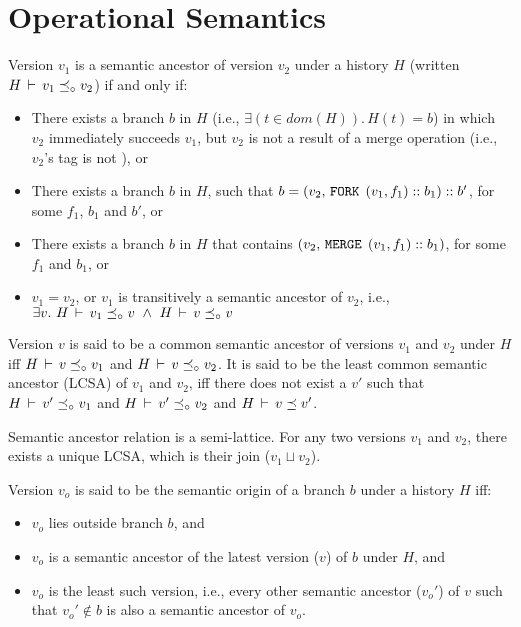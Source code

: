 \section{Operational Semantics}



\begin{definition} 
Version $v_1$ is a semantic ancestor of version $v_2$ under a history
$H$ (written $H\,\vdash\,v_1 \preceq_{\circ} v_2$) if and only if:
\begin{itemize}
  \item There exists a branch $b$ in $H$ (i.e., $\exists(t\in
  dom(H)).\,H(t) = b$) in which $v_2$ immediately succeeds
  $v_1$, but $v_2$ is not a result of a merge operation (i.e.,
  $v_2$'s tag is not ), or
  \item There exists a branch $b$ in $H$, such that $b = (v_2, 
  \,{\tt FORK}\,\; (v_1,f_1)::b_1)::b'$, for some $f_1$, $b_1$ and $b'$, or
  \item There exists a branch $b$ in $H$ that contains
  $(v_2, \,{\tt MERGE}\,\;(v_1,f_1)::b_1)$, for some $f_1$ and $b_1$, or
  \item $v_1 = v_2$, or $v_1$ is transitively a semantic ancestor of
  $v_2$, i.e., $\exists v.~ H\,\vdash\,v_1 \preceq_{\circ} v ~\wedge~
  H\,\vdash\,v \preceq_{\circ} v$ 
\end{itemize}
\end{definition}

\begin{definition} 
Version $v$ is said to be a common semantic ancestor of versions $v_1$
and $v_2$ under $H$ iff $H\,\vdash\,v \preceq_{\circ} v_1$ and $H\,\vdash\,v
\preceq_{\circ} v_2$. It is said to be the least common semantic ancestor
(LCSA) of $v_1$ and $v_2$, iff there does not exist a $v'$ such that
$H\,\vdash\,v' \preceq_{\circ} v_1$ and $H\,\vdash\,v' \preceq_{\circ} v_2$ and
$H\,\vdash\,v \preceq v'$.
\end{definition}

\begin{lemma}
Semantic ancestor relation is a semi-lattice. For any two versions
$v_1$ and $v_2$, there exists a unique LCSA, which is their join ($v_1
\sqcup v_2$).
\end{lemma}

\begin{definition} 
Version $v_o$ is said to be the semantic origin of a branch $b$ under
a history $H$ iff:
\begin{itemize}
  \item $v_o$ lies outside branch $b$, and
  \item $v_o$ is a semantic ancestor of the latest version ($v$) of $b$
  under $H$, and
  \item $v_o$ is the least such version, i.e., every other semantic
  ancestor ($v_o'$) of $v$ such that $v_o' \not\in b$ is also a
  semantic ancestor of $v_o$.
\end{itemize}
\end{definition}

